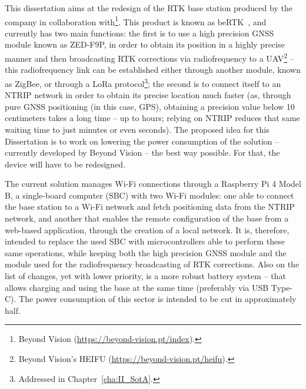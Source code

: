 This dissertation aims at the redesign of the RTK base station produced by the company in collaboration with\footnote{Beyond Vision (\url{https://beyond-vision.pt/index}).}. This product is known as beRTK\textsuperscript{\textregistered}~\cite{beRTK_2022}, and currently has two main functions: the first is to use a high precision GNSS module known as ZED-F9P, in order to obtain its position in a highly precise manner and then broadcasting RTK corrections via radiofrequency to a UAV\footnote{Beyond Vision's HEIFU\textsuperscript{\textregistered} (\url{https://beyond-vision.pt/heifu}).} -- this radiofrequency link can be established either through another module, known as ZigBee, or through a LoRa protocol\footnote{Addressed in Chapter~\ref{cha:II_SotA}.};
the second is to connect itself to an NTRIP network in order to obtain its precise location much faster (as, through pure GNSS positioning (in this case, GPS), obtaining a precision value below 10 centimeters takes a long time -- up to hours; relying on NTRIP reduces that same waiting time to just minutes or even seconds).
The proposed idea for this Dissertation is to work on lowering the power consumption of the solution -- currently developed by Beyond Vision -- the best way possible. For that, the device will have to be redesigned.

The current solution manages Wi-Fi connections through a Raspberry Pi 4 Model B, a single-board computer (SBC) with two Wi-Fi modules:
one able to connect the base station to a Wi-Fi network and fetch positioning data from the NTRIP network, and another that enables the remote configuration of the base from a web-based application, through the creation of a local network.
It is, therefore, intended to replace the used SBC with microcontrollers able to perform these same operations, while keeping both the high precision GNSS module and the module used for the radiofrequency broadcasting of RTK corrections.
Also on the list of changes, yet with lower priority, is a more robust battery system -- that allows charging and using the base at the same time (preferably via USB Type-C). The power consumption of this sector is intended to be cut in approximately half.
